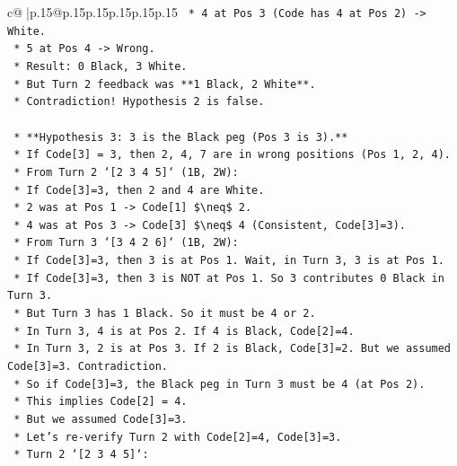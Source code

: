 \documentclass{article}
\begin{document}
{\begin{supertabular}{c@{$\;$}|p{.15\linewidth}@{}p{.15\linewidth}p{.15\linewidth}p{.15\linewidth}p{.15\linewidth}p{.15\linewidth}}
{{{\texttt{                *   4 at Pos 3 (Code has 4 at Pos 2) {-}> White.} \\
\texttt{                *   5 at Pos 4 {-}> Wrong.} \\
\texttt{                *   Result: 0 Black, 3 White.} \\
\texttt{                *   But Turn 2 feedback was **1 Black, 2 White**.} \\
\texttt{                *   Contradiction! Hypothesis 2 is false.} \\
\\ 
\texttt{    *   **Hypothesis 3: 3 is the Black peg (Pos 3 is 3).**} \\
\texttt{        *   If Code{[}3{]} = 3, then 2, 4, 7 are in wrong positions (Pos 1, 2, 4).} \\
\texttt{        *   From Turn 2 `{[}2 3 4 5{]}` (1B, 2W):} \\
\texttt{            *   If Code{[}3{]}=3, then 2 and 4 are White.} \\
\texttt{            *   2 was at Pos 1 {-}> Code{[}1{]} \$\textbackslash{}neq\$ 2.} \\
\texttt{            *   4 was at Pos 3 {-}> Code{[}3{]} \$\textbackslash{}neq\$ 4 (Consistent, Code{[}3{]}=3).} \\
\texttt{        *   From Turn 3 `{[}3 4 2 6{]}` (1B, 2W):} \\
\texttt{            *   If Code{[}3{]}=3, then 3 is at Pos 1. Wait, in Turn 3, 3 is at Pos 1.} \\
\texttt{            *   If Code{[}3{]}=3, then 3 is NOT at Pos 1. So 3 contributes 0 Black in Turn 3.} \\
\texttt{            *   But Turn 3 has 1 Black. So it must be 4 or 2.} \\
\texttt{            *   In Turn 3, 4 is at Pos 2. If 4 is Black, Code{[}2{]}=4.} \\
\texttt{            *   In Turn 3, 2 is at Pos 3. If 2 is Black, Code{[}3{]}=2. But we assumed Code{[}3{]}=3. Contradiction.} \\
\texttt{            *   So if Code{[}3{]}=3, the Black peg in Turn 3 must be 4 (at Pos 2).} \\
\texttt{            *   This implies Code{[}2{]} = 4.} \\
\texttt{            *   But we assumed Code{[}3{]}=3.} \\
\texttt{            *   Let's re{-}verify Turn 2 with Code{[}2{]}=4, Code{[}3{]}=3.} \\
\texttt{                *   Turn 2 `{[}2 3 4 5{]}`:} \\
}}}
\end{supertabular}}
\end{document}
